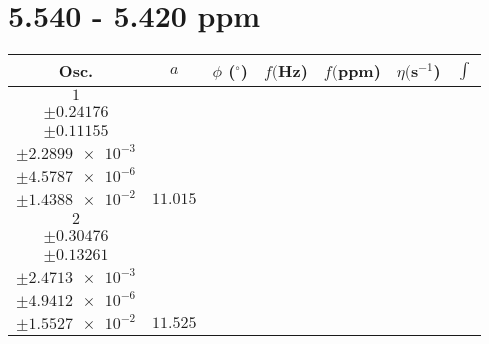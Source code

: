 \documentclass[8pt]{article}
\begin{document}
\section*{5.540 - 5.420 ppm}
\begin{longtable}[l]{c c c c c c c}
\toprule
Osc. & $a$ & $\phi$ ($^{\circ}$) & $f ($Hz) & $f ($ppm) & $\eta ($s$^{-1}$) & $\int$\\
\midrule
$\num{1}$ & \begin{tabular}[c]{@{}c@{}}$\num{130.54}$ \\ $\pm\num{0.24176}$\end{tabular} & \begin{tabular}[c]{@{}c@{}}$\num{1.999}$ \\ $\pm\num{0.11155}$\end{tabular} & \begin{tabular}[c]{@{}c@{}}$\num{2.7198e+3}$ \\ $\pm\num{2.2899e-3}$\end{tabular} & \begin{tabular}[c]{@{}c@{}}$\num{5.4381}$ \\ $\pm\num{4.5787e-6}$\end{tabular} & \begin{tabular}[c]{@{}c@{}}$\num{9.4059}$ \\ $\pm\num{1.4388e-2}$\end{tabular} & $\num{11.015}$\\
$\num{2}$ & \begin{tabular}[c]{@{}c@{}}$\num{136.53}$ \\ $\pm\num{0.30476}$\end{tabular} & \begin{tabular}[c]{@{}c@{}}$\num{0.99254}$ \\ $\pm\num{0.13261}$\end{tabular} & \begin{tabular}[c]{@{}c@{}}$\num{2.7253e+3}$ \\ $\pm\num{2.4713e-3}$\end{tabular} & \begin{tabular}[c]{@{}c@{}}$\num{5.4491}$ \\ $\pm\num{4.9412e-6}$\end{tabular} & \begin{tabular}[c]{@{}c@{}}$\num{9.3753}$ \\ $\pm\num{1.5527e-2}$\end{tabular} & $\num{11.525}$\\

\end{longtable}
\end{document}
